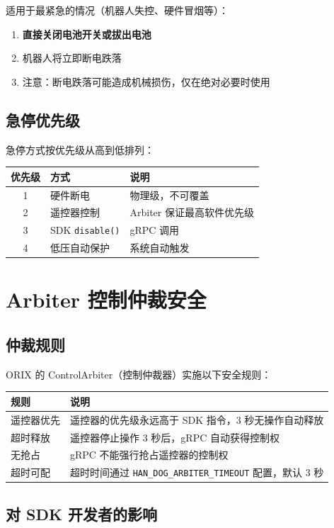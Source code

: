 \documentclass[a4paper,11pt,openany]{book}
\begin{document}
适用于最紧急的情况（机器人失控、硬件冒烟等）：

\begin{enumerate}[nosep]
  \item \textbf{直接关闭电池开关或拔出电池}
  \item 机器人将立即断电跌落
  \item 注意：断电跌落可能造成机械损伤，仅在绝对必要时使用
\end{enumerate}

\subsection{急停优先级}

急停方式按优先级从高到低排列：

\begin{longtable}{cll}
\toprule
优先级 & 方式 & 说明 \\
\midrule
\endhead
1 & 硬件断电 & 物理级，不可覆盖 \\
2 & 遥控器控制 & Arbiter 保证最高软件优先级 \\
3 & SDK \texttt{disable()} & gRPC 调用 \\
4 & 低压自动保护 & 系统自动触发 \\
\bottomrule
\end{longtable}

\section{Arbiter 控制仲裁安全}

\subsection{仲裁规则}

ORIX 的 ControlArbiter（控制仲裁器）实施以下安全规则：

\begin{longtable}{ll}
\toprule
规则 & 说明 \\
\midrule
\endhead
遥控器优先 & 遥控器的优先级永远高于 SDK 指令，3 秒无操作自动释放 \\
超时释放 & 遥控器停止操作 3 秒后，gRPC 自动获得控制权 \\
无抢占 & gRPC 不能强行抢占遥控器的控制权 \\
超时可配 & 超时时间通过 \texttt{HAN\_DOG\_ARBITER\_TIMEOUT} 配置，默认 3 秒 \\
\bottomrule
\end{longtable}

\subsection{对 SDK 开发者的影响}
\end{document}
